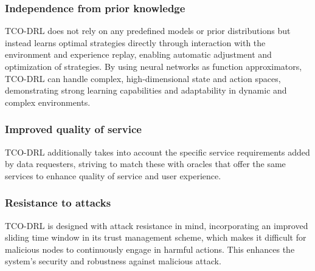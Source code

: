 \subsubsection{Independence from prior knowledge} TCO-DRL does not rely on any predefined models or prior distributions but instead learns optimal strategies directly through interaction with the environment and experience replay, enabling automatic adjustment and optimization of strategies. By using neural networks as function approximators, TCO-DRL can handle complex, high-dimensional state and action spaces, demonstrating strong learning capabilities and adaptability in dynamic and complex environments.
\subsubsection{Improved quality of service} TCO-DRL additionally takes into account the specific service requirements added by data requesters, striving to match these with oracles that offer the same services to enhance quality of service and user experience.
\subsubsection{Resistance to attacks} TCO-DRL is designed with attack resistance in mind, incorporating an improved sliding time window in its trust management scheme, which makes it difficult for malicious nodes to continuously engage in harmful actions. This enhances the system's security and robustness against malicious attack.





